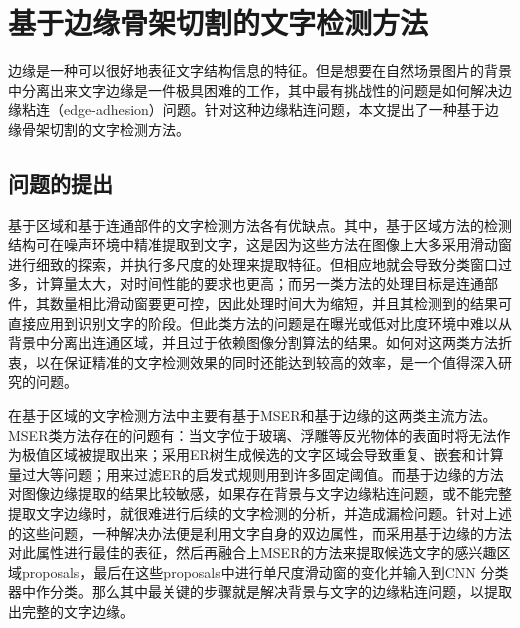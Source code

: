 ﻿%
%
%
%
%
%

\chapter{基于边缘骨架切割的文字检测方法}
\label{sec.c3}

    边缘是一种可以很好地表征文字结构信息的特征。但是想要在自然场景图片的背景中分离出来文字边缘是一件极具困难的工作，其中最有挑战性的问题是如何解决边缘粘连（edge-adhesion）问题。针对这种边缘粘连问题，本文提出了一种基于边缘骨架切割的文字检测方法。

    \section{问题的提出}

    基于区域和基于连通部件的文字检测方法各有优缺点。其中，基于区域方法的检测结构可在噪声环境中精准提取到文字，这是因为这些方法在图像上大多采用滑动窗进行细致的探索，并执行多尺度的处理来提取特征。但相应地就会导致分类窗口过多，计算量太大，对时间性能的要求也更高；而另一类方法的处理目标是连通部件，其数量相比滑动窗要更可控，因此处理时间大为缩短，并且其检测到的结果可直接应用到识别文字的阶段。但此类方法的问题是在曝光或低对比度环境中难以从背景中分离出连通区域，并且过于依赖图像分割算法的结果。如何对这两类方法折衷，以在保证精准的文字检测效果的同时还能达到较高的效率，是一个值得深入研究的问题。

    在基于区域的文字检测方法中主要有基于MSER和基于边缘的这两类主流方法。MSER类方法存在的问题有：当文字位于玻璃、浮雕等反光物体的表面时将无法作为极值区域被提取出来；采用ER树生成候选的文字区域会导致重复、嵌套和计算量过大等问题；用来过滤ER的启发式规则用到许多固定阈值。而基于边缘的方法对图像边缘提取的结果比较敏感，如果存在背景与文字边缘粘连问题，或不能完整提取文字边缘时，就很难进行后续的文字检测的分析，并造成漏检问题。针对上述的这些问题，一种解决办法便是利用文字自身的双边属性，而采用基于边缘的方法对此属性进行最佳的表征，然后再融合上MSER的方法来提取候选文字的感兴趣区域proposals，最后在这些proposals中进行单尺度滑动窗的变化并输入到CNN 分类器中作分类。那么其中最关键的步骤就是解决背景与文字的边缘粘连问题，以提取出完整的文字边缘。

